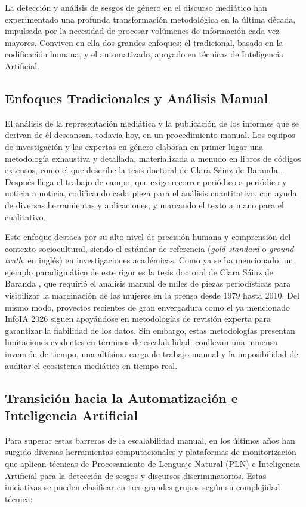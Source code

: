 
La detección y análisis de sesgos de género en el discurso mediático han experimentado una profunda transformación metodológica en la última década, impulsada por la necesidad de procesar volúmenes de información cada vez mayores. Conviven en ella dos grandes enfoques: el tradicional, basado en la codificación humana, y el automatizado, apoyado en técnicas de Inteligencia Artificial.


\subsection{Enfoques Tradicionales y Análisis Manual}

El análisis de la representación mediática y la publicación de los informes que se derivan de él descansan, todavía hoy, en un procedimiento manual. Los equipos de investigación y las expertas en género elaboran en primer lugar una metodología exhaustiva y detallada, materializada a menudo en libros de códigos extensos, como el que describe la tesis doctoral de Clara Sáinz de Baranda \cite{sainzdebaranda2013}. Después llega el trabajo de campo, que exige recorrer periódico a periódico y noticia a noticia, codificando cada pieza para el análisis cuantitativo, con ayuda de diversas herramientas y aplicaciones, y marcando el texto a mano para el cualitativo.


Este enfoque destaca por su alto nivel de precisión humana y comprensión del contexto sociocultural, siendo el estándar de referencia (\textit{gold standard} o \textit{ground truth}, en inglés) en investigaciones académicas. Como ya se ha mencionado, un ejemplo paradigmático de este rigor es la tesis doctoral de Clara Sáinz de Baranda \cite{sainzdebaranda2013}, que requirió el análisis manual de miles de piezas periodísticas para visibilizar la marginación de las mujeres en la prensa desde 1979 hasta 2010. Del mismo modo, proyectos recientes de gran envergadura como el ya mencionado InfoIA 2026 \cite{sainzdebaranda2026} siguen apoyándose en metodologías de revisión experta para garantizar la fiabilidad de los datos. Sin embargo, estas metodologías presentan limitaciones evidentes en términos de escalabilidad: conllevan una inmensa inversión de tiempo, una altísima carga de trabajo manual y la imposibilidad de auditar el ecosistema mediático en tiempo real.


\subsection{Transición hacia la Automatización e Inteligencia Artificial}
Para superar estas barreras de la escalabilidad manual, en los últimos años han surgido diversas herramientas computacionales y plataformas de monitorización que aplican técnicas de Procesamiento de Lenguaje Natural (PLN) e Inteligencia Artificial para la detección de sesgos y discursos discriminatorios. Estas iniciativas se pueden clasificar en tres grandes grupos según su complejidad técnica:

